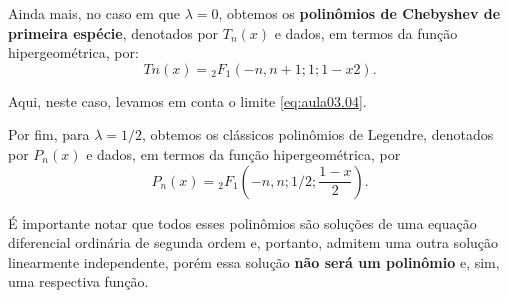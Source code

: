 Ainda mais, no caso em que $\lambda = 0$, obtemos os \textbf{polinômios de Chebyshev de primeira espécie}, denotados por $T_n(x)$ e dados, em termos da função hipergeométrica, por:
$$Tn(x) = {}_2F_1\left(-n, n + 1; 1;1 - x2\right).$$


Aqui, neste caso, levamos em conta o limite \autoref{eq:aula03.04}.

Por fim, para $\lambda = 1/2$, obtemos os clássicos polinômios de Legendre, denotados por $P_n(x)$ e dados, em termos da função hipergeométrica, por
$$P_n(x) = {}_2F_1\left(-n, n; 1/2;\dfrac{1 - x}{2}\right).$$

É importante notar que todos esses polinômios são soluções de uma equação diferencial ordinária de segunda ordem e, portanto, admitem uma outra solução linearmente independente, porém essa solução \textbf{não será um polinômio} e, sim, uma respectiva função.


